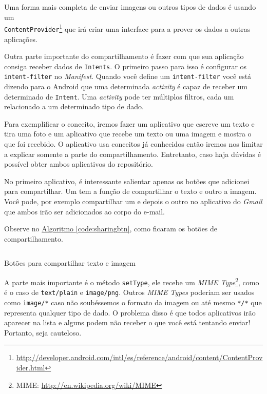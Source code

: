 \documentclass[a4paper,12pt,brazil,oneside]{book}
\begin{document}
		Uma forma mais completa de enviar imagens ou outros tipos de dados é usando um \\ \texttt{ContentProvider}\footnote{\href{http://developer.android.com/intl/es/reference/android/content/ContentProvider.html}{http://developer.android.com/intl/es/reference/android/content/ContentProvider.html}} que irá criar uma interface para a prover os dados a outras aplicações.

		Outra parte importante do compartilhamento é fazer com que sua aplicação consiga receber dados de \texttt{Intents}. O primeiro passo para isso é configurar os \texttt{intent-filter} no \emph{Manifest}. Quando você define um \texttt{intent-filter} você está dizendo para o Android que uma determinada \emph{activity} é capaz de receber um determinado de \texttt{Intent}. Uma \emph{activity} pode ter múltiplos filtros, cada um relacionado a um determinado tipo de dado.

		Para exemplificar o conceito, iremos fazer um aplicativo que escreve um texto e tira uma foto e um aplicativo que recebe um texto ou uma imagem e mostra o que foi recebido. O aplicativo usa conceitos já conhecidos então iremos nos limitar a explicar somente a parte do compartilhamento. Entretanto, caso haja dúvidas é possível obter ambos aplicativos do repositório.

		No primeiro aplicativo, é interessante salientar apenas os botões que adicionei para compartilhar. Um tem a função de compartilhar o texto e outro a imagem. Você pode, por exemplo compartilhar um e depois o outro no aplicativo do \emph{Gmail} que ambos irão ser adicionados ao corpo do e-mail.
		
		Observe no \hyperref[code:sharingbtn]{Algoritmo \ref*{code:sharingbtn}}, como ficaram os botões de compartilhamento.

		\begin{listing}[H]
		\inputminted[linenos=true,fontsize=\small,frame=lines, framesep=2mm, tabsize=2,numbersep=5pt]{java}{src/api/sharing/sharingbtn.java}
		\caption{Botões para compartilhar texto e imagem}
		\label{code:sharingbtn}
		\end{listing} 		

		A parte mais importante é o método \texttt{setType}, ele recebe um \emph{MIME Type}\footnote{MIME: \href{http://en.wikipedia.org/wiki/MIME}{http://en.wikipedia.org/wiki/MIME}}, como é o caso de \texttt{text/plain} e \texttt{image/png}. Outros \emph{MIME Types} poderiam ser usados como \texttt{image/*} caso não soubéssemos o formato da imagem ou até mesmo \texttt{*/*} que representa qualquer tipo de dado. O problema disso é que todos aplicativos irão aparecer na lista e alguns podem não receber o que você está tentando enviar! Portanto, seja cauteloso.
\end{document}
